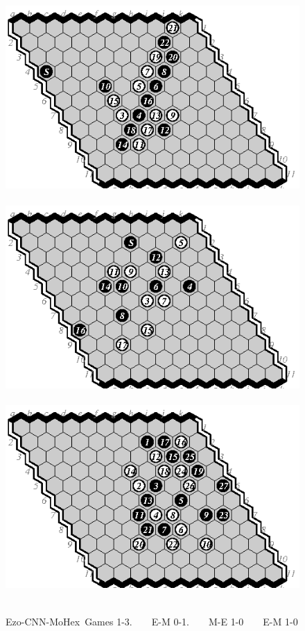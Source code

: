 \documentclass{icga}
\def\Ec{\mbox{\sc Ezo-CNN}}
\def\Mx{\mbox{\sc MoHex}}
\begin{document}
\begin{figure}[hbp]
\includegraphics[scale=1]{pix/11.em1.eps}\hspace*{-1.2cm}\
\includegraphics[scale=1]{pix/11.me2.eps}\hspace*{-1.2cm}\
\includegraphics[scale=1]{pix/11.em3.eps}\hspace*{-1.2cm}\
\caption{\Ec-\Mx\ Games 1-3. ~ ~ E-M 0-1. ~ ~ M-E 1-0 ~ ~ E-M 1-0}
\end{figure}
\end{document}
